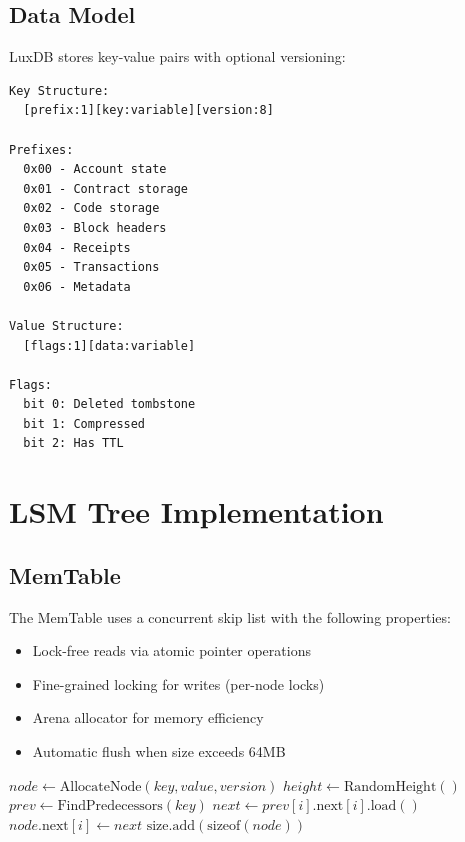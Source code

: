 \documentclass[11pt,a4paper]{article}
\begin{document}
\subsection{Data Model}

LuxDB stores key-value pairs with optional versioning:

\begin{lstlisting}
Key Structure:
  [prefix:1][key:variable][version:8]

Prefixes:
  0x00 - Account state
  0x01 - Contract storage
  0x02 - Code storage
  0x03 - Block headers
  0x04 - Receipts
  0x05 - Transactions
  0x06 - Metadata

Value Structure:
  [flags:1][data:variable]

Flags:
  bit 0: Deleted tombstone
  bit 1: Compressed
  bit 2: Has TTL
\end{lstlisting}

\section{LSM Tree Implementation}

\subsection{MemTable}

The MemTable uses a concurrent skip list with the following properties:

\begin{itemize}
    \item Lock-free reads via atomic pointer operations
    \item Fine-grained locking for writes (per-node locks)
    \item Arena allocator for memory efficiency
    \item Automatic flush when size exceeds 64MB
\end{itemize}

\begin{algorithm}
\caption{MemTable Insert}
\begin{algorithmic}[1]
    \State $node \gets \text{AllocateNode}(key, value, version)$
    \State $height \gets \text{RandomHeight}()$ 
    \State $prev \gets \text{FindPredecessors}(key)$
        \Repeat
            \State $next \gets prev[i].\text{next}[i].\text{load}()$
            \State $node.\text{next}[i] \gets next$
    \EndFor
    \State $\text{size}.\text{add}(\text{sizeof}(node))$
\EndProcedure
\end{algorithmic}
\end{algorithm}
\end{document}
